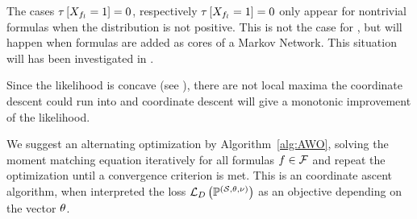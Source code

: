 %
The cases $\tau\left[X_{f_{l}}=1\right]=0$, respectively $\tau\left[X_{f_{l}}=1\right]=0$ only appear for nontrivial formulas when the distribution is not positive.
This is not the case for \MarkovLogicNetworks{}, but will happen when formulas are added as cores of a Markov Network.
This situation will has been investigated in .


Since the likelihood is concave (see \cite{koller_probabilistic_2009}), there are not local maxima the coordinate descent could run into and coordinate descent will give a monotonic improvement of the likelihood.

We suggest an alternating optimization by Algorithm~\ref{alg:AWO}, solving the moment matching equation iteratively for all formulas $f\in\mathcal{F}$ and repeat the optimization until a convergence criterion is met.
This is an coordinate ascent algorithm, when interpreted the loss $\mathcal{L}_{D}\left(\mathbb{P}^{(\mathcal{S},\theta,\nu)}\right)$ as an objective depending on the vector $\theta$.

